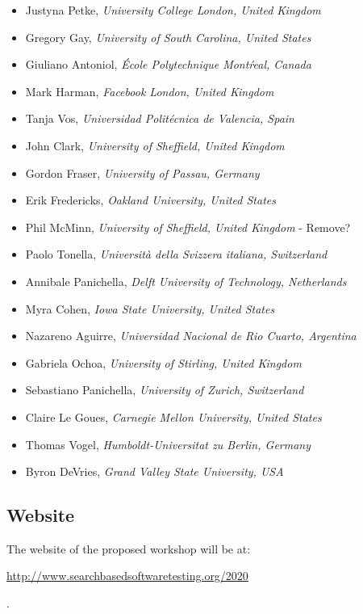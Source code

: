 \documentclass[10pt,conference]{IEEEtran}
\begin{document}
{\small
\begin{itemize}[leftmargin=*]\setlength{\itemsep}{0cm}
\item Justyna Petke, {\it University College London, United Kingdom}
\item Gregory Gay, {\it University of South Carolina, United States}
\item Giuliano Antoniol, {\it \'Ecole Polytechnique Mont\'real, Canada}
\item Mark Harman, {\it Facebook London, United Kingdom}
\item Tanja Vos, {\it Universidad Polit\'ecnica de Valencia, Spain}
\item John Clark, {\it University of Sheffield, United Kingdom}
\item Gordon Fraser, {\it University of Passau, Germany}
\item Erik Fredericks, {\it Oakland University, United States}
\item Phil McMinn, {\it University of Sheffield, United Kingdom} - Remove?
\item Paolo Tonella, {\it Universit\`a della Svizzera italiana, Switzerland}
\item Annibale Panichella, {\it Delft University of Technology, Netherlands}
\item Myra Cohen, {\it Iowa State University, United States}
\item Nazareno Aguirre, {\it Universidad Nacional de Rio Cuarto, Argentina}
\item Gabriela Ochoa, {\it University of Stirling, United Kingdom}
\item Sebastiano Panichella, {\it University of Zurich, Switzerland}
\item Claire Le Goues, {\it Carnegie Mellon University, United States}
\item Thomas Vogel, {\it Humboldt-Universitat zu Berlin, Germany}
\item Byron DeVries, {\it Grand Valley State University, USA}
\end{itemize}
}
 
\subsection{Website}

The website of the proposed workshop will be at:\\\centerline{\url{http://www.searchbasedsoftwaretesting.org/2020}}.

\end{document}
